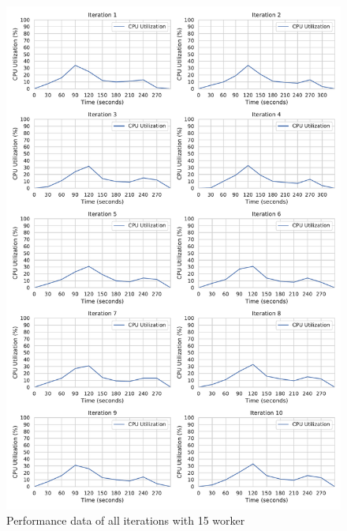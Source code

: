 \begin{figure}[h]
\centering
\includegraphics[scale=0.4]{images/07_evaluation/regression/15_worker_cpu_performance}
\caption{Performance data of all iterations with 15 worker}
\label{fig:appendix_eval_regression_static15}
\end{figure}

